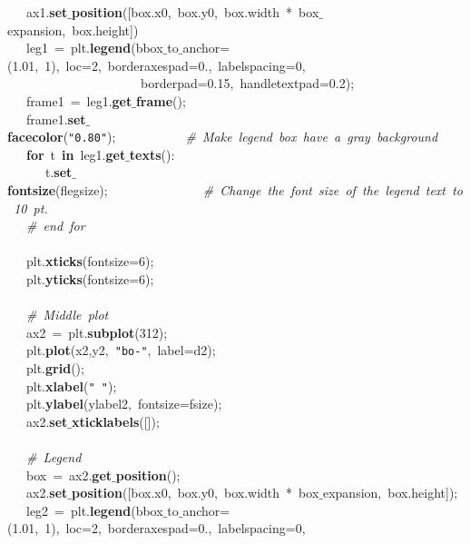 \mbox{}\ \ \ ax1.\textbf{set$\_$position}([box.x0,\ box.y0,\ box.width\ *\ box$\_$expansion,\ box.height])\ \  \\
\mbox{}\ \ \ leg1\ =\ plt.\textbf{legend}(bbox$\_$to$\_$anchor=(1.01,\ 1),\ loc=2,\ borderaxespad=0.,\ labelspacing=0,\  \\
\mbox{}\ \ \ \ \ \ \ \ \ \ \ \ \ \ \ \ \ \ \ \ \ borderpad=0.15,\ handletextpad=0.2); \\
\mbox{}\ \ \ frame1\ =\ leg1.\textbf{get$\_$frame}(); \\
\mbox{}\ \ \ frame1.\textbf{set$\_$facecolor}(\texttt{"{}0.80"{}});\ \ \ \ \ \ \ \ \ \ \ \textit{\#\ Make\ legend\ box\ have\ a\ gray\ background} \\
\mbox{}\ \ \ \textbf{for}\ t\ \textbf{in}\ leg1.\textbf{get$\_$texts}(): \\
\mbox{}\ \ \ \ \ \ t.\textbf{set$\_$fontsize}(flegsize);\ \ \ \ \ \ \ \ \ \ \ \ \ \ \ \textit{\#\ Change\ the\ font\ size\ of\ the\ legend\ text\ to\ 10\ pt.} \\
\mbox{}\ \ \ \textit{\#\ end\ for} \\
\mbox{}\ \ \  \\
\mbox{}\ \ \ plt.\textbf{xticks}(fontsize=6); \\
\mbox{}\ \ \ plt.\textbf{yticks}(fontsize=6); \\
\mbox{}\ \ \  \\
\mbox{}\ \ \ \textit{\#\ Middle\ plot} \\
\mbox{}\ \ \ ax2\ =\ plt.\textbf{subplot}(312); \\
\mbox{}\ \ \ plt.\textbf{plot}(x2,y2,\ \texttt{"{}bo-"{}},\ label=d2); \\
\mbox{}\ \ \ plt.\textbf{grid}(); \\
\mbox{}\ \ \ plt.\textbf{xlabel}(\texttt{"{}\ "{}}); \\
\mbox{}\ \ \ plt.\textbf{ylabel}(ylabel2,\ fontsize=fsize); \\
\mbox{}\ \ \ ax2.\textbf{set$\_$xticklabels}([]); \\
\mbox{}\ \ \  \\
\mbox{}\ \ \ \textit{\#\ Legend} \\
\mbox{}\ \ \ box\ =\ ax2.\textbf{get$\_$position}(); \\
\mbox{}\ \ \ ax2.\textbf{set$\_$position}([box.x0,\ box.y0,\ box.width\ *\ box$\_$expansion,\ box.height]); \\
\mbox{}\ \ \ leg2\ =\ plt.\textbf{legend}(bbox$\_$to$\_$anchor=(1.01,\ 1),\ loc=2,\ borderaxespad=0.,\ labelspacing=0,\  \\
